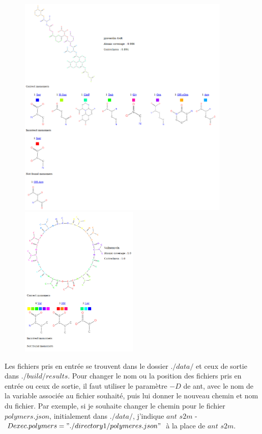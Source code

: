 \documentclass[11pt, a4paper]{report}
\begin{document}
	\begin{figure}[H]
		\centering
		\includegraphics[width=0.9\textwidth]{images/pyoverdin G4R.png}
		\hspace{2cm}
		\includegraphics[width=0.5\textwidth]{images/Valinomycin.png}
	\end{figure}
	
	Les fichiers pris en entrée se trouvent dans le dossier $./data/$ et ceux de sortie dans $./build/results$. Pour changer le nom ou la position des fichiers pris en entrée ou ceux de sortie, il faut utiliser le paramètre $-D$ de ant, avec le nom de la  variable associée au fichier souhaité, puis lui donner le nouveau chemin et nom du fichier. Par exemple, si je souhaite changer le chemin pour le fichier $polymers.json$, initialement dans $./data/$, j'indique $ant$ $s2m$ -$Dexec.polymers="./directory1/polymeres.json"$ à la place de $ant$ $s2m$.
	
\end{document}
